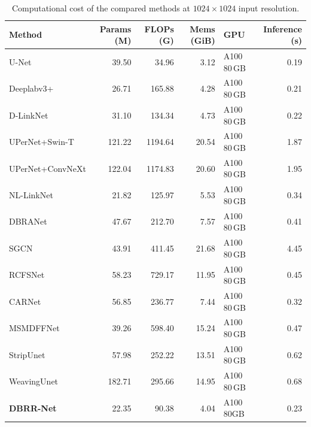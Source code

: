 \documentclass[a4paper,fleqn, review]{cas-sc}
\begin{document}
\begin{table}[pos=t]
\caption{Computational cost of the compared methods at $1024\times1024$
input resolution.}
\label{tab:sota-eff}
\begin{tabular*}{\tblwidth}{@{}LRRRLR@{}}
\toprule
Method & Params (M) & FLOPs (G) & Mems (GiB) & GPU & Inference (s) \\
\midrule
U-Net \cite{ronneberger2015unet}         & 39.50  & 34.96   & 3.12  & A100 80\,GB & 0.19 \\
Deeplabv3+ \cite{chen2018deeplabv3plus}  & 26.71  & 165.88 & 4.28  & A100 80\,GB & 0.21 \\
D-LinkNet \cite{zhou2018dlinknet}        & 31.10  & 134.34 & 4.73  & A100 80\,GB & 0.22 \\
UPerNet+Swin-T \cite{liu2021swin}        & 121.22 & 1194.64& 20.54 & A100 80\,GB & 1.87 \\
UPerNet+ConvNeXt \cite{liu2022convnext}  & 122.04 & 1174.83& 20.60 & A100 80\,GB & 1.95 \\
NL-LinkNet \cite{wang2022nllinknet}      & 21.82  & 125.97 & 5.53  & A100 80\,GB & 0.34 \\
DBRANet \cite{chen2022dbranet}           & 47.67  & 212.70 & 7.57  & A100 80\,GB & 0.41 \\
SGCN \cite{sgcn}                         & 43.91  & 411.45 & 21.68 & A100 80\,GB & 4.45 \\
RCFSNet \cite{rcfsnet}                   & 58.23  & 729.17 & 11.95 & A100 80\,GB & 0.45 \\
CARNet \cite{carnet}                     & 56.85  & 236.77 & 7.44  & A100 80\,GB & 0.32 \\
MSMDFFNet \cite{msmdffnet}               & 39.26  & 598.40 & 15.24 & A100 80\,GB & 0.47 \\
StripUnet \cite{stripunet}               & 57.98  & 252.22 & 13.51 & A100 80\,GB & 0.62 \\
WeavingUnet \cite{weavingunet}           & 182.71 & 295.66 & 14.95 & A100 80\,GB & 0.68 \\
\midrule
\textbf{DBRR-Net}                        & 22.35  & 90.38  & 4.04  & A100 80GB & 0.23 \\
\bottomrule
\end{tabular*}
\end{table}
\end{document}
